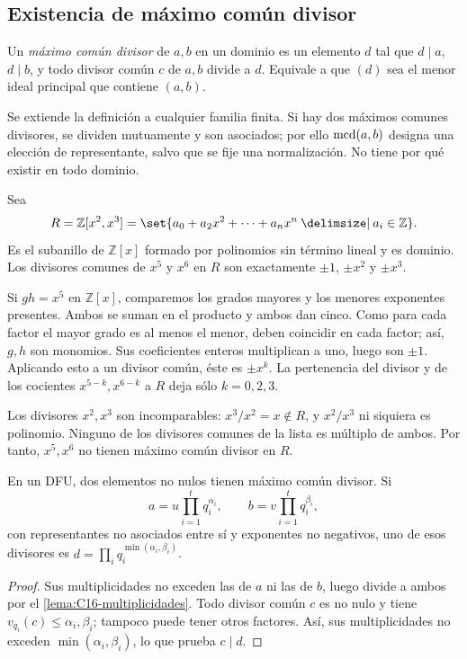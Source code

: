 \subsection{Existencia de máximo común divisor}\label{tema:16-2-2}
\begin{defi}
Un \emph{máximo común divisor} de $a,b$ en un dominio es un elemento $d$ tal que $d\mid a$, $d\mid b$, y todo divisor común $c$ de $a,b$ divide a $d$. Equivale a que $(d)$ sea el menor ideal principal que contiene $(a,b)$.
\end{defi}
Se extiende la definición a cualquier familia finita. Si hay dos máximos comunes divisores, se dividen mutuamente y son asociados; por ello $\operatorname{mcd}(a,b)$ designa una elección de representante, salvo que se fije una normalización. No tiene por qué existir en todo dominio.

\begin{ejem}
Sea
\[
R=\mathbb Z[x^2,x^3]
=\set{a_0+a_2x^2+\cdots+a_nx^n\given a_i\in\mathbb Z}.
\]
Es el subanillo de $\mathbb Z[x]$ formado por polinomios sin término lineal y es dominio. Los divisores comunes de $x^5$ y $x^6$ en $R$ son exactamente $\pm1$, $\pm x^2$ y $\pm x^3$.

Si $gh=x^5$ en $\mathbb Z[x]$, comparemos los grados mayores y los menores exponentes presentes. Ambos se suman en el producto y ambos dan cinco. Como para cada factor el mayor grado es al menos el menor, deben coincidir en cada factor; así, $g,h$ son monomios. Sus coeficientes enteros multiplican a uno, luego son $\pm1$. Aplicando esto a un divisor común, éste es $\pm x^k$. La pertenencia del divisor y de los cocientes $x^{5-k},x^{6-k}$ a $R$ deja sólo $k=0,2,3$.

Los divisores $x^2,x^3$ son incomparables: $x^3/x^2=x\notin R$, y $x^2/x^3$ ni siquiera es polinomio. Ninguno de los divisores comunes de la lista es múltiplo de ambos. Por tanto, $x^5,x^6$ no tienen máximo común divisor en $R$.
\end{ejem}

\begin{lema}\label{lema:C16-mcd}
En un DFU, dos elementos no nulos tienen máximo común divisor. Si
\[
a=u\prod_{i=1}^t q_i^{\alpha_i},\qquad
b=v\prod_{i=1}^t q_i^{\beta_i},
\]
con representantes no asociados entre sí y exponentes no negativos, uno de esos divisores es $d=\prod_i q_i^{\min(\alpha_i,\beta_i)}$.
\end{lema}
\begin{proof}
Sus multiplicidades no exceden las de $a$ ni las de $b$, luego divide a ambos por el \cref{lema:C16-multiplicidades}. Todo divisor común $c$ es no nulo y tiene $v_{q_i}(c)\leq\alpha_i,\beta_i$; tampoco puede tener otros factores. Así, sus multiplicidades no exceden $\min(\alpha_i,\beta_i)$, lo que prueba $c\mid d$.
\end{proof}


